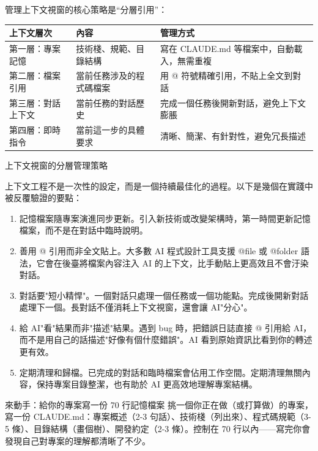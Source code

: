 管理上下文視窗的核心策略是“分層引用”：

\begin{center}
\begin{tabularx}{\linewidth}{|X|X|X|}
\hline
\textbf{上下文層次} & \textbf{內容} & \textbf{管理方式} \tabularnewline
\hline
第一層：專案記憶 & 技術棧、規範、目錄結構 & 寫在 CLAUDE.md 等檔案中，自動載入，無需重複 \tabularnewline
第二層：檔案引用 & 當前任務涉及的程式碼檔案 & 用 @ 符號精確引用，不貼上全文到對話 \tabularnewline
第三層：對話上下文 & 當前任務的對話歷史 & 完成一個任務後開新對話，避免上下文膨脹 \tabularnewline
第四層：即時指令 & 當前這一步的具體要求 & 清晰、簡潔、有針對性，避免冗長描述 \tabularnewline
\hline
\end{tabularx}
\end{center}

\begin{center}\small\color{gray}上下文視窗的分層管理策略\end{center}


上下文工程不是一次性的設定，而是一個持續最佳化的過程。以下是幾個在實踐中被反覆驗證的要點：

\begin{enumerate}
  \item 記憶檔案隨專案演進同步更新。引入新技術或改變架構時，第一時間更新記憶檔案，而不是在對話中臨時說明。
  \item 善用 @ 引用而非全文貼上。大多數 AI 程式設計工具支援 @file 或 @folder 語法，它會在後臺將檔案內容注入 AI 的上下文，比手動貼上更高效且不會汙染對話。
  \item 對話要"短小精悍"。一個對話只處理一個任務或一個功能點。完成後開新對話處理下一個。長對話不僅消耗上下文視窗，還會讓 AI"分心"。
  \item 給 AI"看"結果而非"描述"結果。遇到 bug 時，把錯誤日誌直接 @ 引用給 AI，而不是用自己的話描述"好像有個什麼錯誤"。AI 看到原始資訊比看到你的轉述更有效。
  \item 定期清理和歸檔。已完成的對話和臨時檔案會佔用工作空間。定期清理無關內容，保持專案目錄整潔，也有助於 AI 更高效地理解專案結構。
\end{enumerate}

\begin{tcbpractice}{來動手：給你的專案寫一份 70 行記憶檔案}
挑一個你正在做（或打算做）的專案，寫一份 CLAUDE.md：專案概述（2-3 句話）、技術棧（列出來）、程式碼規範（3-5 條）、目錄結構（畫個樹）、開發約定（2-3 條）。控制在 70 行以內——寫完你會發現自己對專案的理解都清晰了不少。

\end{tcbpractice}

